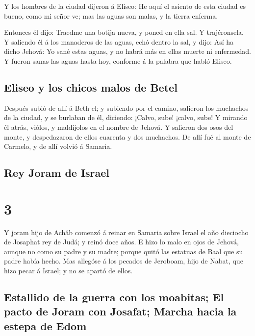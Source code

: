  Y los hombres de la ciudad dijeron á Eliseo: He aquí el
asiento de esta ciudad es bueno, como mi señor ve; mas las aguas son
malas, y la tierra enferma.

 Entonces él dijo: Traedme una botija nueva, y poned en
ella sal. Y trajéronsela.  Y saliendo él á los manaderos de
las aguas, echó dentro la sal, y dijo: Así ha dicho Jehová: Yo sané
estas aguas, y no habrá más en ellas muerte ni enfermedad. 
Y fueron sanas las aguas hasta hoy, conforme á la palabra que habló
Eliseo.

\hypertarget{eliseo-y-los-chicos-malos-de-betel}{%
\subsection{Eliseo y los chicos malos de
Betel}\label{eliseo-y-los-chicos-malos-de-betel}}

 Después subió de allí á Beth-el; y subiendo por el camino,
salieron los muchachos de la ciudad, y se burlaban de él, diciendo:
¡Calvo, sube! ¡calvo, sube!  Y mirando él atrás, viólos, y
maldíjolos en el nombre de Jehová. Y salieron dos osos del monte, y
despedazaron de ellos cuarenta y dos muchachos.  De allí
fué al monte de Carmelo, y de allí volvió á Samaria.

\hypertarget{rey-joram-de-israel}{%
\subsection{Rey Joram de Israel}\label{rey-joram-de-israel}}

\hypertarget{section-2}{%
\section{3}\label{section-2}}

 Y joram hijo de Achâb comenzó á reinar en Samaria sobre
Israel el año dieciocho de Josaphat rey de Judá; y reinó doce años.
 E hizo lo malo en ojos de Jehová, aunque no como su padre y
su madre; porque quitó las estatuas de Baal que su padre había hecho.
 Mas allegóse á los pecados de Jeroboam, hijo de Nabat, que
hizo pecar á Israel; y no se apartó de ellos.

\hypertarget{estallido-de-la-guerra-con-los-moabitas-el-pacto-de-joram-con-josafat-marcha-hacia-la-estepa-de-edom}{%
\subsection{Estallido de la guerra con los moabitas; El pacto de Joram
con Josafat; Marcha hacia la estepa de
Edom}\label{estallido-de-la-guerra-con-los-moabitas-el-pacto-de-joram-con-josafat-marcha-hacia-la-estepa-de-edom}}

